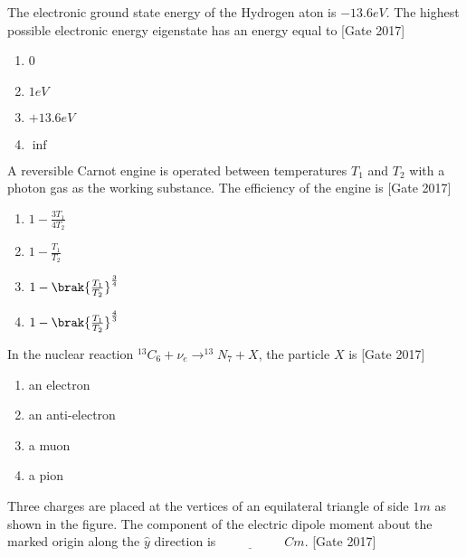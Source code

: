	\item The electronic ground state energy of the Hydrogen aton is $-13.6eV$. The highest possible electronic energy eigenstate has an energy equal to \hfill{[Gate 2017]}
	\begin{multicols}{4}
	\begin{enumerate}
		\item 0
		\item $1eV$
		\item $+13.6eV$
		\item $\inf$
	\end{enumerate}
\end{multicols}
	\item A reversible Carnot engine is operated between temperatures $T_1$ and $T_2$  with a photon gas as the working substance. The efficiency of the engine is \hfill{[Gate 2017]}
	\begin{multicols}{4}
	\begin{enumerate}
		\item $1-\frac{3T_1}{4T_2}$
		\item $1-\frac{T_1}{T_2}$
		\item $1-\brak{\frac{T_1}{T_2}}^{\frac{3}{4}}$
		\item $1-\brak{\frac{T_1}{T_2}}^{\frac{4}{3}}$
	\end{enumerate}
\end{multicols}
	\item In the nuclear reaction $^{13}C_6 + \nu _e \rightarrow ^{13}N_7 + X$, the particle $X$ is \hfill{[Gate 2017]}
\begin{multicols}{4}
	\begin{enumerate}
		\item an electron
		\item an anti-electron
		\item a muon
		\item a pion
	\end{enumerate}
\end{multicols}	

	\item Three charges  are placed at the vertices of an equilateral triangle of side $1m$ as shown in the figure. The component of the electric dipole moment about the marked origin along the $\hat y$ direction is $\underline{\hspace{2cm}}$ $Cm.$ \hfill{[Gate 2017]}
		

	

